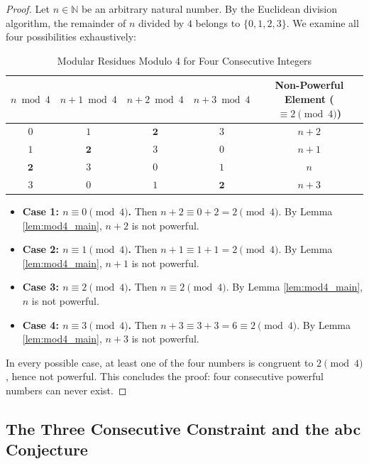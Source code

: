 \documentclass[11pt,a4paper]{article}
\theoremstyle{definition}
\begin{document}
\begin{proof}
Let $n \in \mathbb{N}$ be an arbitrary natural number.
By the Euclidean division algorithm, the remainder of $n$ divided by $4$ belongs to $\{0, 1, 2, 3\}$.
We examine all four possibilities exhaustively:

\begin{table}[ht]
\centering
\caption{Modular Residues Modulo 4 for Four Consecutive Integers}
\label{tab:mod4_cases}
\vspace{0.5em}
\begin{tabular}{@{}ccccc@{}}
\toprule
$n \bmod 4$ & $n+1 \bmod 4$ & $n+2 \bmod 4$ & $n+3 \bmod 4$ & Non-Powerful Element ($\equiv 2 \pmod 4$) \\
\midrule
$0$ & $1$ & $\mathbf{2}$ & $3$ & $n + 2$ \\
$1$ & $\mathbf{2}$ & $3$ & $0$ & $n + 1$ \\
$\mathbf{2}$ & $3$ & $0$ & $1$ & $n$ \\
$3$ & $0$ & $1$ & $\mathbf{2}$ & $n + 3$ \\
\bottomrule
\end{tabular}
\end{table}

\begin{itemize}
    \item \textbf{Case 1: $n \equiv 0 \pmod 4$.}
    Then $n+2 \equiv 0 + 2 = 2 \pmod 4$. By Lemma \ref{lem:mod4_main}, $n+2$ is not powerful.
    \item \textbf{Case 2: $n \equiv 1 \pmod 4$.}
    Then $n+1 \equiv 1 + 1 = 2 \pmod 4$. By Lemma \ref{lem:mod4_main}, $n+1$ is not powerful.
    \item \textbf{Case 3: $n \equiv 2 \pmod 4$.}
    Then $n \equiv 2 \pmod 4$. By Lemma \ref{lem:mod4_main}, $n$ is not powerful.
    \item \textbf{Case 4: $n \equiv 3 \pmod 4$.}
    Then $n+3 \equiv 3 + 3 = 6 \equiv 2 \pmod 4$. By Lemma \ref{lem:mod4_main}, $n+3$ is not powerful.
\end{itemize}
In every possible case, at least one of the four numbers is congruent to $2 \pmod 4$, hence not powerful.
This concludes the proof: four consecutive powerful numbers can never exist.
\end{proof}

\subsection{The Three Consecutive Constraint and the abc Conjecture}
\end{document}
